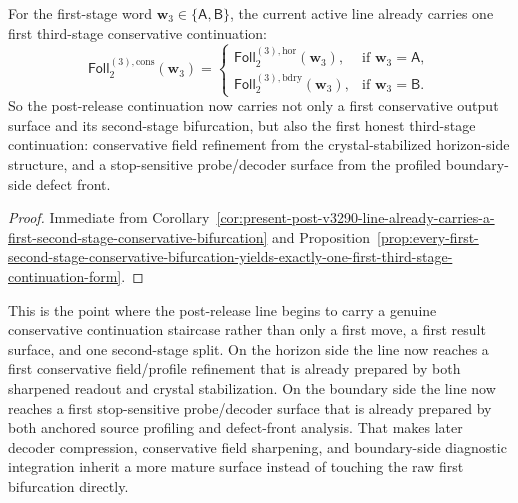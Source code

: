\begin{corollary}
\label{cor:present-post-v3290-line-already-carries-a-first-third-stage-conservative-continuation}
For the first-stage word \(\mathbf w_3\in\{\mathsf A,\mathsf B\}\), the current active line already carries one first third-stage conservative continuation:
\[
 \mathsf{Foll}^{(3),\mathrm{cons}}_{2}(\mathbf w_3)
 =
 \begin{cases}
 \mathsf{Foll}^{(3),\mathrm{hor}}_{2}(\mathbf w_3), & \text{if }\mathbf w_3=\mathsf A,\\[2mm]
 \mathsf{Foll}^{(3),\mathrm{bdry}}_{2}(\mathbf w_3), & \text{if }\mathbf w_3=\mathsf B.
 \end{cases}
\]
So the post-release continuation now carries not only a first conservative output surface and its second-stage bifurcation, but also the first honest third-stage continuation: conservative field refinement from the crystal-stabilized horizon-side structure, and a stop-sensitive probe/decoder surface from the profiled boundary-side defect front.
\end{corollary}

\begin{proof}
Immediate from Corollary~\ref{cor:present-post-v3290-line-already-carries-a-first-second-stage-conservative-bifurcation} and Proposition~\ref{prop:every-first-second-stage-conservative-bifurcation-yields-exactly-one-first-third-stage-continuation-form}.
\end{proof}

\begin{remark}
\label{rem:what-the-first-third-stage-continuation-now-buys}
This is the point where the post-release line begins to carry a genuine conservative continuation staircase rather than only a first move, a first result surface, and one second-stage split. On the horizon side the line now reaches a first conservative field/profile refinement that is already prepared by both sharpened readout and crystal stabilization. On the boundary side the line now reaches a first stop-sensitive probe/decoder surface that is already prepared by both anchored source profiling and defect-front analysis. That makes later decoder compression, conservative field sharpening, and boundary-side diagnostic integration inherit a more mature surface instead of touching the raw first bifurcation directly.
\end{remark}


